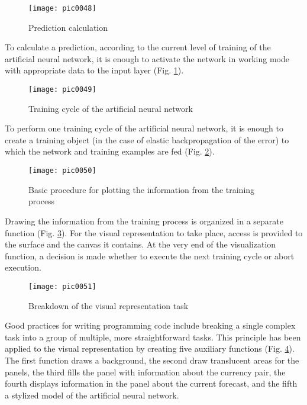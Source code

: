 \begin{figure}[h]
\centering
\texttt{[image: pic0048]}
\caption{Prediction calculation}
\label{fig:pic0048}
\end{figure}
\FloatBarrier

To calculate a prediction, according to the current level of training of the artificial neural network, it is enough to activate the network in working mode with appropriate data to the input layer (Fig. \ref{fig:pic0048}).

\begin{figure}[h]
\centering
\texttt{[image: pic0049]}
\caption{Training cycle of the artificial neural network}
\label{fig:pic0049}
\end{figure}
\FloatBarrier

To perform one training cycle of the artificial neural network, it is enough to create a training object (in the case of elastic backpropagation of the error) to which the network and training examples are fed (Fig. \ref{fig:pic0049}).

\begin{figure}[h]
\centering
\texttt{[image: pic0050]}
\caption{Basic procedure for plotting the information from the training process}
\label{fig:pic0050}
\end{figure}
\FloatBarrier

Drawing the information from the training process is organized in a separate function (Fig. \ref{fig:pic0050}). For the visual representation to take place, access is provided to the surface and the canvas it contains. At the very end of the visualization function, a decision is made whether to execute the next training cycle or abort execution.

\begin{figure}[h]
\centering
\texttt{[image: pic0051]}
\caption{Breakdown of the visual representation task}
\label{fig:pic0051}
\end{figure}
\FloatBarrier

Good practices for writing programming code include breaking a single complex task into a group of multiple, more straightforward tasks. This principle has been applied to the visual representation by creating five auxiliary functions (Fig. \ref{fig:pic0051}). The first function draws a background, the second draw translucent areas for the panels, the third fills the panel with information about the currency pair, the fourth displays information in the panel about the current forecast, and the fifth a stylized model of the artificial neural network.


